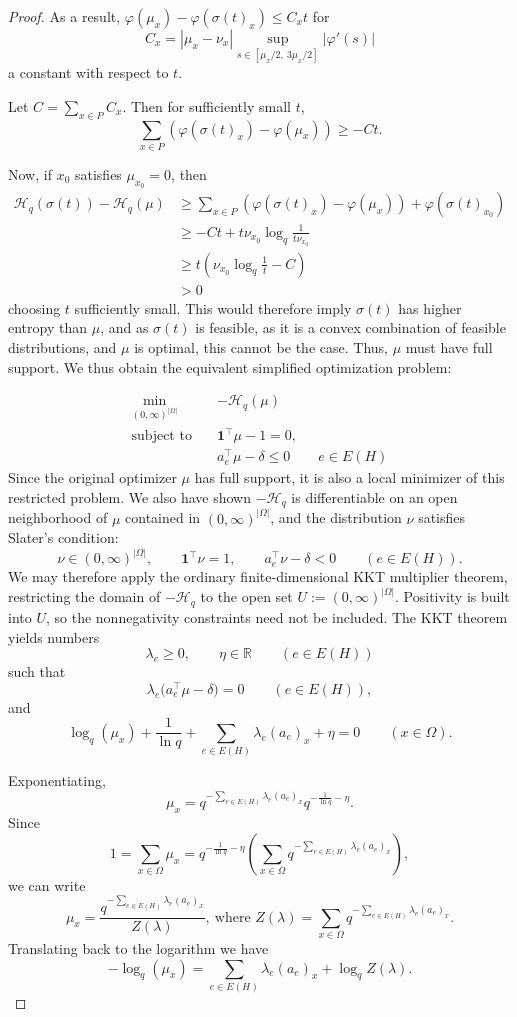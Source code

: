 \documentclass[12pt]{article}
\begin{document}
\begin{proof}
As a result, $\varphi(\mu_x)-\varphi(\sigma(t)_x)\leq C_xt$ for 
\[
C_x=|\mu_x-\nu_x|\sup_{s\in[{\mu_x/}2,\ 3\mu_x/2]}\left|\varphi'(s)\right|
\]
a constant with respect to $t$. 

Let $C=\sum_{x\in P}C_x$. Then for sufficiently small $t$,
\[
\sum_{x\in P}(\varphi(\sigma(t)_x)-\varphi(\mu_x))\geq-Ct.
\]

Now, if $x_0$ satisfies $\mu_{x_0}=0$, then
\begin{align*}
    \mathcal H_q(\sigma(t))-\mathcal H_q(\mu)&\geq\sum_{x\in P}\left(\varphi(\sigma(t)_x)-\varphi(\mu_x)\right)+\varphi(\sigma(t)_{x_0})\\
    &\geq-Ct+t\nu_{x_0}\log_q\frac{1}{t\nu_{x_0}}\\
    &\geq t(\nu_{x_0}\log_q\frac{1}{t}-C)\\
    &>0
\end{align*}
choosing $t$ sufficiently small.
This would therefore imply $\sigma(t)$ has higher entropy than $\mu$, and as $\sigma(t)$ is feasible, as it is a convex combination of feasible distributions, and $\mu$ is optimal, this cannot be the case. Thus, $\mu$ must have full support. We thus obtain the equivalent simplified optimization problem:

\[
\begin{aligned}
\min_{(0,\infty)^{|\Omega|}}\quad & -\mathcal{H}_q(\mu)\\
\text{subject to}\quad
&\mathbf1^\top\mu-1=0,\\
&a_{e}^\top\mu-\delta\leq0\qquad e\in E(H)
\end{aligned}
\]
Since the original optimizer \(\mu\) has full support, it is also a
local minimizer of this restricted problem. We also have shown $-\mathcal H_q$ is differentiable on an open neighborhood of $\mu$ contained in $(0,\infty)^{|\Omega|}$, and the distribution $\nu$ satisfies Slater's condition:
\[
\nu\in(0,\infty)^{|\Omega|},\qquad\mathbf1^\top\nu=1,\qquad a_e^\top\nu-\delta<0\qquad(e\in E(H)).
\]
We may therefore apply the ordinary finite-dimensional KKT multiplier
theorem, restricting the domain of $-\mathcal H_q$ to the open set $U:=(0,\infty)^{|\Omega|}$. Positivity is built into $U$, so the nonnegativity constraints need not be included. The KKT theorem yields numbers
\[
\lambda_e\geq0,\qquad\eta\in\mathbb R\qquad(e\in E(H))
\]
such that
\[
\lambda_e\bigl(a_e^\top\mu-\delta)=0\qquad (e\in E(H)),
\]
and
\[
\log_q(\mu_x)+\frac{1}{\ln q}+\sum_{e\in E(H)}\lambda_e(a_e)_x+\eta=0\qquad (x\in\Omega).
\]

\noindent Exponentiating,
\[
\mu_x=q^{-\sum_{e\in E(H)}\lambda_e(a_e)_x}q^{-\frac{1}{\ln q}-\eta}.
\]
Since 
\[
1=\sum_{x\in\Omega}\mu_x=q^{-\frac{1}{\ln q}-\eta}\left(\sum_{x\in\Omega}q^{-\sum_{e\in E(H)}\lambda_e(a_e)_x}\right),
\]
we can write 
\[
\mu_x=\frac{q^{-\sum_{e\in E(H)}\lambda_e(a_e)_x}}{Z(\lambda)},\ \text{where }Z(\lambda)=\sum_{x\in\Omega}q^{-\sum_{e\in E(H)}\lambda_e(a_e)_x}.
\]
Translating back to the logarithm we have
\[
-\log_q(\mu_x)=\sum_{e\in E(H)}\lambda_e(a_e)_x+\log_qZ(\lambda).
\]


\end{proof}
\end{document}

